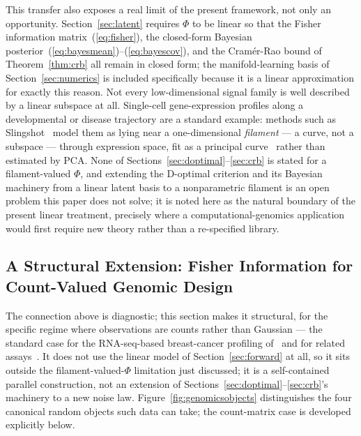 \documentclass[11pt]{article}
\begin{document}
This transfer also exposes a real limit of the present framework, not only an opportunity. Section~\ref{sec:latent} requires $\Phi$ to be linear so that the Fisher information matrix~(\ref{eq:fisher}), the closed-form Bayesian posterior~(\ref{eq:bayesmean})--(\ref{eq:bayescov}), and the Cram\'{e}r-Rao bound of Theorem~\ref{thm:crb} all remain in closed form; the manifold-learning basis of Section~\ref{sec:numerics} is included specifically because it is a linear approximation for exactly this reason. Not every low-dimensional signal family is well described by a linear subspace at all. Single-cell gene-expression profiles along a developmental or disease trajectory are a standard example: methods such as Slingshot~\citep{ref30} model them as lying near a one-dimensional \emph{filament} --- a curve, not a subspace --- through expression space, fit as a principal curve~\citep{ref31} rather than estimated by PCA. None of Sections~\ref{sec:doptimal}--\ref{sec:crb} is stated for a filament-valued $\Phi$, and extending the D-optimal criterion and its Bayesian machinery from a linear latent basis to a nonparametric filament is an open problem this paper does not solve; it is noted here as the natural boundary of the present linear treatment, precisely where a computational-genomics application would first require new theory rather than a re-specified library.

\subsection{A Structural Extension: Fisher Information for Count-Valued Genomic Design}
\label{sec:genomicsext}

The connection above is diagnostic; this section makes it structural, for the specific regime where observations are counts rather than Gaussian --- the standard case for the RNA-seq-based breast-cancer profiling of~\citep{ref29,ref36} and for related assays~\citep{ref35,ref37}. It does not use the linear model of Section~\ref{sec:forward} at all, so it sits outside the filament-valued-$\Phi$ limitation just discussed; it is a self-contained parallel construction, not an extension of Sections~\ref{sec:doptimal}--\ref{sec:crb}'s machinery to a new noise law. Figure~\ref{fig:genomicsobjects} distinguishes the four canonical random objects such data can take; the count-matrix case is developed explicitly below.
\end{document}
